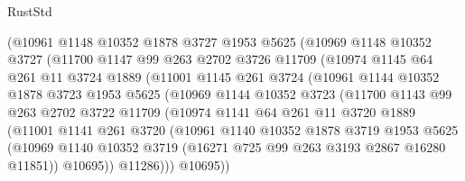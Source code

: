 \begin{lexlean}{RustStd}
\begin{coremodule}
                (@10961
                  @1148
                  @10352
                  @1878
                  @3727
                  @1953
                  @5625
                  (@10969
                    @1148
                    @10352
                    @3727
                    (@11700
                      @1147
                      @99
                      @263
                      @2702
                      @3726
                      @11709
                      (@10974
                        @1145
                        @64
                        @261
                        @11
                        @3724
                        @1889
                        (@11001
                          @1145
                          @261
                          @3724
                          (@10961
                            @1144
                            @10352
                            @1878
                            @3723
                            @1953
                            @5625
                            (@10969
                              @1144
                              @10352
                              @3723
                              (@11700
                                @1143
                                @99
                                @263
                                @2702
                                @3722
                                @11709
                                (@10974
                                  @1141
                                  @64
                                  @261
                                  @11
                                  @3720
                                  @1889
                                  (@11001
                                    @1141
                                    @261
                                    @3720
                                    (@10961
                                      @1140
                                      @10352
                                      @1878
                                      @3719
                                      @1953
                                      @5625
                                      (@10969
                                        @1140
                                        @10352
                                        @3719
                                        (@16271 @725 @99 @263 @3193 @2867 @16280 @11851))
                                      @10695))
                                  @11286)))
                            @10695))

\end{coremodule}
\end{lexlean}
